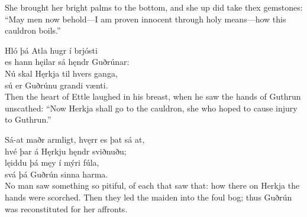 \bvb She brought her bright palms to the bottom, and she up did take thex  gemstones: “May men now behold—I am proven innocent through holy means—how this cauldron boils.”

\bva Hló þá Atla \hld hugr í brjósti \\%
es hann hęilar sá \hld hęndr Guðrúnar: \\%
Nú skal Hęrkja \hld til hvers ganga, \\%
sú er Guðrúnu \hld grandi vænti. \\%

\bvb Then the heart of Ettle laughed in his breast, when he saw the hands of Guthrun unscathed: “Now Herkja shall go to the cauldron, she who hoped to cause injury to Guthrun.”

\bva Sá-at maðr armligt, \hld hvęrr es þat sá at, \\%
hvé þar á Hęrkju \hld hęndr sviðnuðu; \\%
lęiddu þá męy \hld í mýri fúla, \\%
svá þá Guðrún \hld sinna harma.\\%

\bvb No man saw something so pitiful, of each that saw that: how there on Herkja the hands were scorched. Then they led the maiden into the foul bog; thus Guðrún was reconstituted for her affronts.
